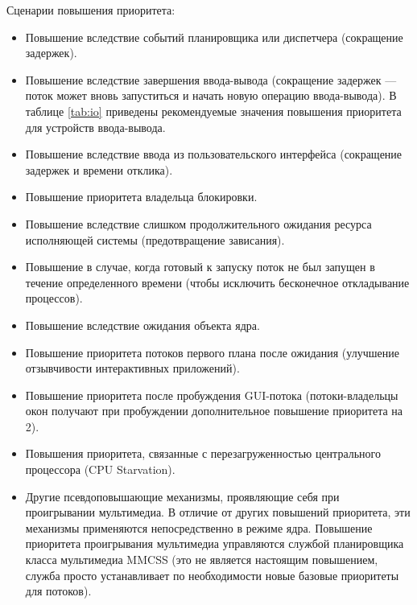 \documentclass[a4paper,oneside,14pt]{extarticle}
\begin{document}
Сценарии повышения приоритета:
\begin{itemize}
	\item Повышение вследствие событий планировщика или диспетчера (сокращение задержек).
	\item Повышение вследствие завершения ввода-вывода (сокращение задержек --- поток может вновь запуститься и начать новую операцию ввода-вывода). В таблице \ref{tab:io} приведены рекомендуемые значения повышения приоритета для устройств ввода-вывода.
	\item Повышение вследствие ввода из пользовательского интерфейса (сокращение задержек и времени отклика).
	\item Повышение приоритета владельца блокировки.
	\item Повышение вследствие слишком продолжительного ожидания ресурса исполняющей системы (предотвращение зависания).
	\item Повышение в случае, когда готовый к запуску поток не был запущен в течение определенного времени (чтобы исключить бесконечное откладывание процессов).
	\item Повышение вследствие ожидания объекта ядра.
	\item Повышение приоритета потоков первого плана после ожидания (улучшение отзывчивости интерактивных приложений).
	\item Повышение приоритета после пробуждения GUI-потока (потоки-владельцы окон получают при пробуждении дополнительное повышение приоритета на 2).
	\item Повышения приоритета, связанные с перезагруженностью центрального процессора (CPU Starvation).
	\item Другие псевдоповышающие механизмы, проявляющие себя при проигрывании мультимедиа. В отличие от других повышений приоритета, эти механизмы применяются непосредственно в режиме ядра. Повышение приоритета проигрывания мультимедиа управляются службой планировщика класса мультимедиа MMCSS (это не является настоящим повышением, служба просто устанавливает по необходимости новые базовые приоритеты для потоков).
\end{itemize}
\end{document}
